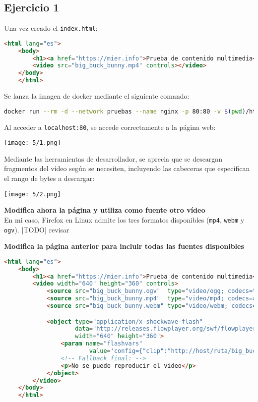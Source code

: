 \subsection{Ejercicio 1}
Una vez creado el \Verb#index.html#:
\begin{lstlisting}[language=html]
	<html lang="es">
	<body>
		<h1><a href="https://mier.info">Prueba de contenido multimedia</a></h1>
		<video src="big_buck_bunny.mp4" controls></video>
	</body>
	</html>
\end{lstlisting}

Se lanza la imagen de docker mediante el siguiente comando:
\begin{lstlisting}[language=bash]
	docker run --rm -d --network pruebas --name nginx -p 80:80 -v $(pwd)/html/video5/:/usr/share/nginx/html nginx
\end{lstlisting}

Al acceder a \Verb#localhost:80#, se accede correctamente a la página web: \\
\begin{minipage}{\linewidth}
	\centering
	\texttt{[image: 5/1.png]}
	\label{fig:5/1}
\end{minipage}

Mediante las herramientas de desarrollador, se aprecia que se descargan fragmentos del vídeo
según se necesiten, incluyendo las cabeceras que especifican el rango de bytes a descargar: \\
\begin{minipage}{\linewidth}
	\centering
	\texttt{[image: 5/2.png]}
	\label{fig:5/2}
\end{minipage}

\textbf{Modifica ahora la página y utiliza como fuente otro vídeo} \\
En mi caso, Firefox en Linux admite los tres formatos disponibles (\Verb#mp4#, \Verb#webm# y \Verb#ogv#).
|TODO| revisar

\textbf{Modifica la página anterior para incluir todas las fuentes disponibles}
\begin{lstlisting}[language=html]
	<html lang="es">
	<body>
		<h1><a href="https://mier.info">Prueba de contenido multimedia</a></h1>
		<video width="640" height="360" controls>
			<source src="big_buck_bunny.ogv"  type="video/ogg; codecs=theora">
			<source src="big_buck_bunny.mp4"  type="video/mp4; codecs=avc1.42E01E,mp4a.40.2">
			<source src="big_buck_bunny.webm" type="video/webm; codecs=vp8,vorbis">

			<object type="application/x-shockwave-flash"
					data="http://releases.flowplayer.org/swf/flowplayer-3.2.1.swf"
					width="640" height="360">
				<param name="flashvars"
						value='config={"clip":"http://host/ruta/big_buck_bunny.mp4"}'/>
				<!-- Fallback final: -->
				<p>No se puede reproducir el video</p>
			</object>
		</video>
	</body>
	</html>
\end{lstlisting}
\newpage{} %
